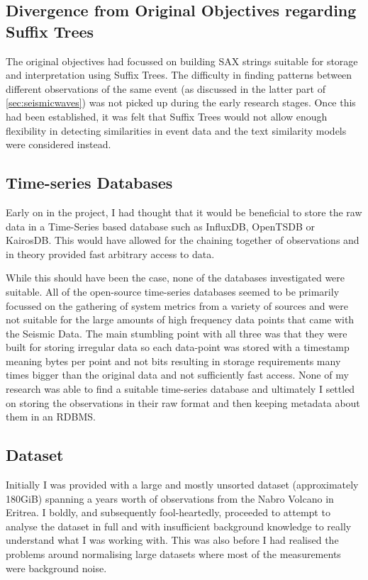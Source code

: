 \documentclass[../report.tex]{subfiles}
\begin{document}
	
\subsection{Divergence from Original Objectives regarding Suffix Trees} \label{sec:alteration-objectives}

	The original objectives had focussed on building SAX strings suitable for storage and interpretation using Suffix Trees.  The difficulty in finding patterns between different observations of the same event (as discussed in the latter part of \cref{sec:seismicwaves}) was not picked up during the early research stages.  Once this had been established, it was felt that Suffix Trees would not allow enough flexibility in detecting similarities in event data and the text similarity models were considered instead.

\subsection{Time-series Databases}
	Early on in the project, I had thought that it would be beneficial to store the raw data in a Time-Series based database such as InfluxDB, OpenTSDB or KairosDB.  This would have allowed for the chaining together of observations and in theory provided fast arbitrary access to data.
	
	While this should have been the case, none of the databases investigated were suitable.  All of the open-source time-series databases seemed to be primarily focussed on the gathering of system metrics from a variety of sources and were not suitable for the large amounts of high frequency data points that came with the Seismic Data.  The main stumbling point with all three was that they were built for storing irregular data so each data-point was stored with a timestamp meaning bytes per point and not bits resulting in storage requirements many times bigger than the original data and not sufficiently fast access.  None of my research was able to find a suitable time-series database and ultimately I settled on storing the observations in their raw format and then keeping metadata about them in an RDBMS.
	
\subsection{Dataset}
	Initially I was provided with a large and mostly unsorted dataset (approximately 180GiB) spanning a years worth of observations from the Nabro Volcano in Eritrea.  I boldly, and subsequently fool-heartedly, proceeded to attempt to analyse the dataset in full and with insufficient background knowledge to really understand what I was working with.  This was also before I had realised the problems around normalising large datasets where most of the measurements were background noise.
	
\end{document}
